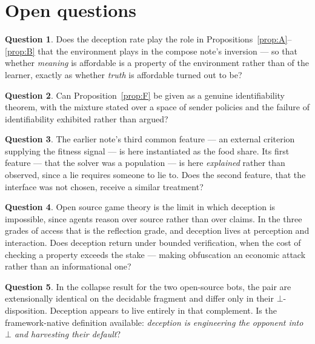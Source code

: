 \documentclass[11pt]{article}
\theoremstyle{plain}
\theoremstyle{definition}
\newtheorem{question}{Question}
\begin{document}
\section{Open questions}
\label{sec:open}

\begin{question}
Does the deception rate play the role in Propositions~\ref{prop:A}--\ref{prop:B} that the environment
plays in the compose note's inversion --- so that whether \emph{meaning} is affordable is a property of
the environment rather than of the learner, exactly as whether \emph{truth} is affordable turned out to
be?
\end{question}

\begin{question}
Can Proposition~\ref{prop:F} be given as a genuine identifiability theorem, with the mixture stated over
a space of sender policies and the failure of identifiability exhibited rather than argued?
\end{question}

\begin{question}
The earlier note's third common feature --- an external criterion supplying the fitness signal --- is
here instantiated as the food share. Its first feature --- that the solver was a population --- is here
\emph{explained} rather than observed, since a lie requires someone to lie to. Does the second feature,
that the interface was not chosen, receive a similar treatment?
\end{question}

\begin{question}
Open source game theory is the limit in which deception is impossible, since agents reason over source
rather than over claims. In the three grades of access that is the reflection grade, and deception lives
at perception and interaction. Does deception return under bounded verification, when the cost of
checking a property exceeds the stake --- making obfuscation an economic attack rather than an
informational one?
\end{question}

\begin{question}
In the collapse result for the two open-source bots, the pair are extensionally identical on the
decidable fragment and differ only in their $\bot$-disposition. Deception appears to live entirely in
that complement. Is the framework-native definition available: \emph{deception is engineering the
opponent into $\bot$ and harvesting their default}?
\end{question}
\end{document}
